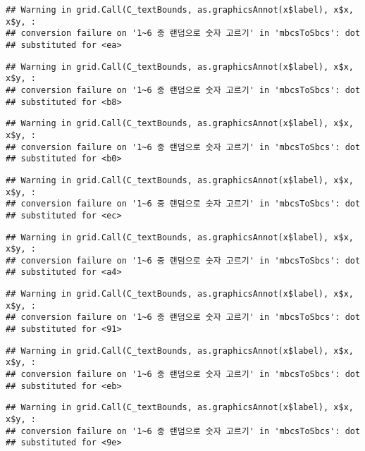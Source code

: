 \documentclass[]{book}
\begin{document}
\begin{verbatim}
## Warning in grid.Call(C_textBounds, as.graphicsAnnot(x$label), x$x, x$y, :
## conversion failure on '1~6 중 랜덤으로 숫자 고르기' in 'mbcsToSbcs': dot
## substituted for <ea>
\end{verbatim}

\begin{verbatim}
## Warning in grid.Call(C_textBounds, as.graphicsAnnot(x$label), x$x, x$y, :
## conversion failure on '1~6 중 랜덤으로 숫자 고르기' in 'mbcsToSbcs': dot
## substituted for <b8>
\end{verbatim}

\begin{verbatim}
## Warning in grid.Call(C_textBounds, as.graphicsAnnot(x$label), x$x, x$y, :
## conversion failure on '1~6 중 랜덤으로 숫자 고르기' in 'mbcsToSbcs': dot
## substituted for <b0>
\end{verbatim}

\begin{verbatim}
## Warning in grid.Call(C_textBounds, as.graphicsAnnot(x$label), x$x, x$y, :
## conversion failure on '1~6 중 랜덤으로 숫자 고르기' in 'mbcsToSbcs': dot
## substituted for <ec>
\end{verbatim}

\begin{verbatim}
## Warning in grid.Call(C_textBounds, as.graphicsAnnot(x$label), x$x, x$y, :
## conversion failure on '1~6 중 랜덤으로 숫자 고르기' in 'mbcsToSbcs': dot
## substituted for <a4>
\end{verbatim}

\begin{verbatim}
## Warning in grid.Call(C_textBounds, as.graphicsAnnot(x$label), x$x, x$y, :
## conversion failure on '1~6 중 랜덤으로 숫자 고르기' in 'mbcsToSbcs': dot
## substituted for <91>
\end{verbatim}

\begin{verbatim}
## Warning in grid.Call(C_textBounds, as.graphicsAnnot(x$label), x$x, x$y, :
## conversion failure on '1~6 중 랜덤으로 숫자 고르기' in 'mbcsToSbcs': dot
## substituted for <eb>
\end{verbatim}

\begin{verbatim}
## Warning in grid.Call(C_textBounds, as.graphicsAnnot(x$label), x$x, x$y, :
## conversion failure on '1~6 중 랜덤으로 숫자 고르기' in 'mbcsToSbcs': dot
## substituted for <9e>
\end{verbatim}
\end{document}
